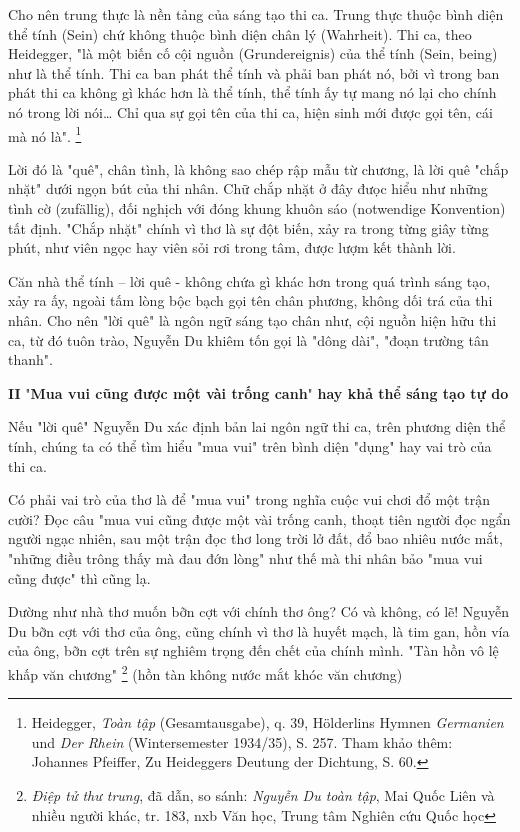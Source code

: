 \documentclass[../main.tex]{subfiles}
\begin{document}
\begin{multicols}{2}
Cho nên trung thực là nền tảng của sáng tạo thi ca. Trung thực thuộc bình diện thể tính (Sein) chứ không thuộc bình diện chân lý (Wahrheit). Thi ca, theo Heidegger, "là một biến cố cội nguồn (Grundereignis) của thể tính (Sein, being) như là thể tính. Thi ca ban phát thể tính và phải ban phát nó, bởi vì trong ban phát thi ca không gì khác hơn là thể tính, thể tính ấy tự mang nó lại cho chính nó trong lời nói… Chỉ qua sự gọi tên của thi ca, hiện sinh mới được gọi tên, cái mà nó là". \footnote{
Heidegger, \textit{Toàn tập} (Gesamtausgabe), q. 39, Hölderlins Hymnen \textit{Germanien} und \textit{Der Rhein} (Wintersemester 1934/35), S. 257. 
Tham khảo thêm: Johannes Pfeiffer, Zu Heideggers Deutung der Dichtung, S. 60.}  
 
Lời đó là "quê", chân tình, là không sao chép rập mẫu từ chương, là lời quê "chắp nhặt" dưới ngọn bút của thi nhân. Chữ chắp nhặt ở đây đưọc hiểu như những tình cờ (zufällig), đối nghịch với đóng khung khuôn sáo (notwendige Konvention) tất định. "Chắp nhặt" chính vì thơ là sự đột biến, xảy ra trong từng giây từng phút, như viên ngọc hay viên sỏi rơi trong tâm, được lượm kết thành lời.    
 
Căn nhà thể tính – lời quê - không chứa gì khác hơn trong quá trình sáng tạo, xảy ra ấy, ngoài tấm lòng bộc bạch gọi tên chân phương, không dối trá của thi nhân. Cho nên "lời quê" là ngôn ngữ sáng tạo chân như, cội nguồn hiện hữu thi ca, từ đó tuôn trào, Nguyễn Du khiêm tốn gọi là "dông dài", "đoạn trường tân thanh". 
 
 
\textbf{II }"\textbf{Mua vui cũng được một vài trống canh}"\textbf{ hay khả thể sáng tạo tự do} 
 
Nếu "lời quê" Nguyễn Du xác định bản lai ngôn ngữ thi ca, trên phương diện thể tính, chúng ta có thể tìm hiểu "mua vui" trên bình diện "dụng" hay vai trò của thi ca. 
 
Có phải vai trò của thơ là để "mua vui" trong nghĩa cuộc vui chơi đổ một trận cười? Đọc câu "mua vui cũng được một vài trống canh, thoạt tiên người đọc ngẩn người ngạc nhiên, sau một trận đọc thơ long trời lở đất, đổ bao nhiêu nước mắt, "những điều trông thấy mà đau đớn lòng" như thế mà thi nhân bảo "mua vui cũng được" thì cũng lạ.  
 
Dường như nhà thơ muốn bỡn cợt với chính thơ ông? Có và không, có lẽ! Nguyễn Du bỡn cợt với thơ của ông, cũng chính vì thơ là huyết mạch, là tim gan, hồn vía của ông, bỡn cợt trên sự nghiêm trọng đến chết của chính mình. "Tàn hồn vô lệ khấp văn chương" \footnote{
\textit{Điệp tử thư trung}, đã dẫn, so sánh: \textit{Nguyễn Du toàn tập}, Mai Quốc Liên và nhiều người khác, tr. 183, nxb Văn học, Trung tâm Nghiên cứu Quốc học}  (hồn tàn không nước mắt khóc văn chương) 
 

\end{multicols}
\end{document}
